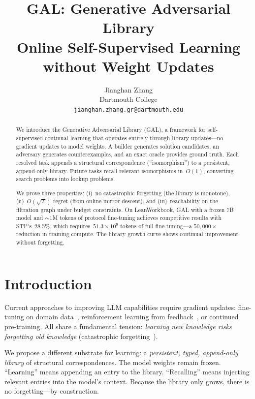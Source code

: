 \documentclass{article}
\title{\textbf{GAL: Generative Adversarial Library}\\
\large Online Self-Supervised Learning without Weight Updates}
\author{
  Jianghan Zhang \\
  Dartmouth College \\
  \texttt{jianghan.zhang.gr@dartmouth.edu}
}
\date{}
\begin{document}
\maketitle

\begin{abstract}
We introduce the Generative Adversarial Library (GAL), a framework
for self-supervised continual learning that operates entirely through
library updates---no gradient updates to model weights.  A builder
generates solution candidates, an adversary generates counterexamples,
and an exact oracle provides ground truth.  Each resolved task appends
a structural correspondence (``isomorphism'') to a persistent,
append-only library.  Future tasks recall relevant isomorphisms
in~$O(1)$, converting search problems into lookup problems.

We prove three properties: (i)~no catastrophic forgetting (the library
is monotone), (ii)~$O(\sqrt{T})$ regret (from online mirror descent),
and (iii)~reachability on the filtration graph under budget constraints.
On LeanWorkbook, GAL with a frozen 7B model and $\sim\!1$M tokens of
protocol fine-tuning achieves competitive results with STP's~28.5\%,
which requires~$51.3 \times 10^9$ tokens of full fine-tuning---a
$50{,}000\times$ reduction in training compute.  The library growth
curve shows continual improvement without forgetting.
\end{abstract}

\section{Introduction}\label{sec:intro}

Current approaches to improving LLM capabilities require gradient
updates: fine-tuning on domain data~\citep{dong2025stp},
reinforcement learning from feedback~\citep{ouyang2022training},
or continued pre-training.  All share a fundamental tension:
\emph{learning new knowledge risks forgetting old knowledge}
(catastrophic forgetting~\citep{mccloskey1989catastrophic}).

We propose a different substrate for learning: a \emph{persistent,
typed, append-only library} of structural correspondences.  The
model weights remain frozen.  ``Learning'' means appending an
entry to the library.  ``Recalling'' means injecting relevant
entries into the model's context.  Because the library only grows,
there is no forgetting---by construction.
\end{document}

